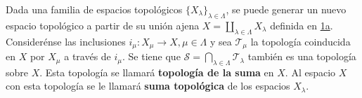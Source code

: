 

\begin{definition}
Dada una familia de espacios topológicos $\{ X_{\lambda} \}_{\lambda \in \Lambda}$, se puede generar un nuevo espacio topológico a partir de su unión ajena $X = \coprod_{\lambda \in \Lambda} X_{\lambda}$ definida en \hyperref[card:1a]{\textsf{1a}}. Considerénse las inclusiones $i_{\mu} : X_{\mu} \longrightarrow X, \mu \in \Lambda$ y sea $\mathcal{T}_{\mu}$ la topología coinducida en $X$ por $X_{\mu}$ a través de $i_{\mu}$. Se tiene que $\mathcal{S} = \bigcap_{\lambda \in \Lambda} \mathcal{T}_{\lambda}$ también es una topología sobre $X$. Esta topología se llamará \textbf{topología de la suma} en $X$. Al espacio $X$ con esta topología se le llamará \textbf{suma topológica} de los espacios $X_{\lambda}$.
\end{definition}
